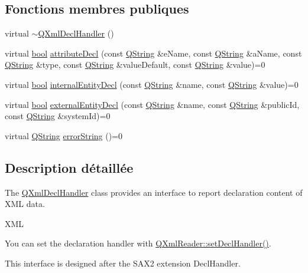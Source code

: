 \subsection*{Fonctions membres publiques}
\begin{DoxyCompactItemize}
\item 
virtual \hyperlink{class_q_xml_decl_handler_a6c0576c95626a196a2eeaef6a55b9c5c}{$\sim$\+Q\+Xml\+Decl\+Handler} ()
\item 
virtual \hyperlink{qglobal_8h_a1062901a7428fdd9c7f180f5e01ea056}{bool} \hyperlink{class_q_xml_decl_handler_a199291017634d148a72812cb40de2043}{attribute\+Decl} (const \hyperlink{class_q_string}{Q\+String} \&e\+Name, const \hyperlink{class_q_string}{Q\+String} \&a\+Name, const \hyperlink{class_q_string}{Q\+String} \&type, const \hyperlink{class_q_string}{Q\+String} \&value\+Default, const \hyperlink{class_q_string}{Q\+String} \&value)=0
\item 
virtual \hyperlink{qglobal_8h_a1062901a7428fdd9c7f180f5e01ea056}{bool} \hyperlink{class_q_xml_decl_handler_ae54a0fbdcd4314143bf556ce5bfac597}{internal\+Entity\+Decl} (const \hyperlink{class_q_string}{Q\+String} \&name, const \hyperlink{class_q_string}{Q\+String} \&value)=0
\item 
virtual \hyperlink{qglobal_8h_a1062901a7428fdd9c7f180f5e01ea056}{bool} \hyperlink{class_q_xml_decl_handler_ae12d792c249eb6f92c54b2e1734fd60f}{external\+Entity\+Decl} (const \hyperlink{class_q_string}{Q\+String} \&name, const \hyperlink{class_q_string}{Q\+String} \&public\+Id, const \hyperlink{class_q_string}{Q\+String} \&system\+Id)=0
\item 
virtual \hyperlink{class_q_string}{Q\+String} \hyperlink{class_q_xml_decl_handler_a92d52f5e57b8041a956c30b92dd28161}{error\+String} ()=0
\end{DoxyCompactItemize}


\subsection{Description détaillée}
The \hyperlink{class_q_xml_decl_handler}{Q\+Xml\+Decl\+Handler} class provides an interface to report declaration content of X\+M\+L data. 

X\+M\+L

You can set the declaration handler with \hyperlink{class_q_xml_reader_a6d16a9420620f829cacb2cdb256d80a7}{Q\+Xml\+Reader\+::set\+Decl\+Handler()}.

This interface is designed after the S\+A\+X2 extension Decl\+Handler.


